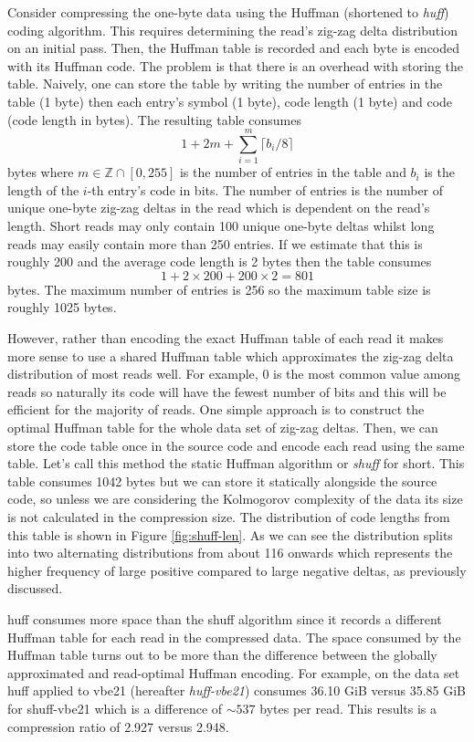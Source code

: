 Consider compressing the one-byte data using the Huffman (shortened to \textit{huff}) coding algorithm. This requires determining the read's zig-zag delta distribution on an initial pass. Then, the Huffman table is recorded and each byte is encoded with its Huffman code. The problem is that there is an overhead with storing the table.
Naively, one can store the table by writing the number of entries in the table (1 byte) then each entry's symbol (1 byte), code length (1 byte) and code (code length in bytes). The resulting table consumes
\[ 1 + 2m + \sum_{i=1}^m\lceil b_i / 8 \rceil \]
bytes where $m\in\mathbb{Z}\cap[0,255]$ is the number of entries in the table and $b_i$ is the length of the $i$-th entry's code in bits. The number of entries is the number of unique one-byte zig-zag deltas in the read which is dependent on the read's length. Short reads may only contain 100 unique one-byte deltas whilst long reads may easily contain more than 250 entries. If we estimate that this is roughly 200 and the average code length is 2 bytes then the table consumes
\[ 1 + 2\times 200 + 200\times 2 = 801 \]
bytes. The maximum number of entries is 256 so the maximum table size is roughly 1025 bytes.

However, rather than encoding the exact Huffman table of each read it makes more sense to use a shared Huffman table which approximates the zig-zag delta distribution of most reads well.
For example, 0 is the most common value among reads so naturally its code will have the fewest number of bits and this will be efficient for the majority of reads. One simple approach is to construct the optimal Huffman table for the whole data set of zig-zag deltas. Then, we can store the code table once in the source code and encode each read using the same table. Let's call this method the static Huffman algorithm or \textit{shuff} for short. This table consumes 1042 bytes but we can store it statically alongside the source code, so unless we are considering the Kolmogorov complexity of the data its size is not calculated in the compression size. The distribution of code lengths from this table is shown in Figure \ref{fig:shuff-len}. As we can see the distribution splits into two alternating distributions from about 116 onwards which represents the higher frequency of large positive compared to large negative deltas, as previously discussed.

huff consumes more space than the shuff algorithm since it records a different Huffman table for each read in the compressed data. The space consumed by the Huffman table turns out to be more than the difference between the globally approximated and read-optimal Huffman encoding. For example, on the data set huff applied to vbe21 (hereafter \textit{huff-vbe21}) consumes 36.10 GiB versus 35.85 GiB for shuff-vbe21 which is a difference of $\sim537$ bytes per read. This results is a compression ratio of 2.927 versus 2.948.

